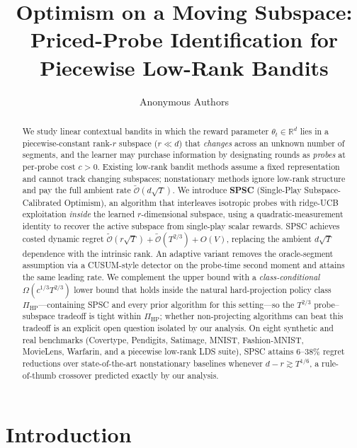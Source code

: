 \documentclass{article}
\title{Optimism on a Moving Subspace:\\Priced-Probe Identification for Piecewise Low-Rank Bandits}
\author{%
  Anonymous Authors%
}
\newcommand{\R}{\mathbb{R}}
\newcommand{\tilO}{\widetilde{\mathcal{O}}}
\begin{document}
\maketitle

\begin{abstract}
We study linear contextual bandits in which the reward parameter
$\theta_t \in \R^d$ lies in a piecewise-constant rank-$r$ subspace
($r \ll d$) that \emph{changes} across an unknown number of segments,
and the learner may purchase information by designating rounds as
\emph{probes} at per-probe cost $c > 0$. Existing low-rank bandit
methods assume a fixed representation and cannot track changing
subspaces; nonstationary methods ignore low-rank structure and pay
the full ambient rate $\tilO(d\sqrt{T})$.
We introduce \textbf{SPSC} (Single-Play Subspace-Calibrated
Optimism), an algorithm that interleaves isotropic probes with ridge-UCB
exploitation \emph{inside} the learned $r$-dimensional subspace, using a
quadratic-measurement identity to recover the active subspace from
single-play scalar rewards. SPSC achieves costed dynamic regret
$\tilO(r\sqrt{T}) + \tilO(T^{2/3}) + O(V)$, replacing the ambient
$d\sqrt{T}$ dependence with the intrinsic rank. An adaptive
variant removes the oracle-segment assumption via a CUSUM-style
detector on the probe-time second moment and attains the same leading
rate. We complement the upper bound with a \emph{class-conditional}
$\Omega(c^{1/3}T^{2/3})$ lower bound that holds inside the natural
hard-projection policy class $\Pi_{\mathrm{HP}}$---containing SPSC and
every prior algorithm for this setting---so the $T^{2/3}$ probe--subspace
tradeoff is tight within $\Pi_{\mathrm{HP}}$; whether non-projecting
algorithms can beat this tradeoff is an explicit open question
isolated by our analysis. On eight synthetic and real benchmarks
(Covertype, Pendigits, Satimage, MNIST, Fashion-MNIST, MovieLens,
Warfarin, and a piecewise low-rank LDS suite), SPSC attains
6--38\% regret reductions over state-of-the-art nonstationary baselines
whenever $d - r \gtrsim T^{1/6}$, a rule-of-thumb crossover predicted
exactly by our analysis.
\end{abstract}

\section{Introduction}
\label{sec:intro}
\end{document}

